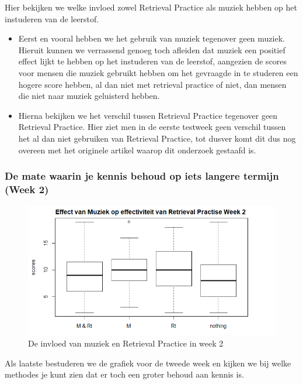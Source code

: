 \documentclass{hogent-article}
\begin{document}
Hier bekijken we welke invloed zowel Retrieval Practice als muziek hebben op het instuderen van de leerstof.
\\
\begin{itemize}
    \item Eerst en vooral hebben we het gebruik van muziek tegenover geen muziek.
    Hieruit kunnen we verrassend genoeg toch afleiden dat muziek een positief effect lijkt te hebben op het instuderen van de leerstof, aangezien de scores voor mensen die muziek gebruikt hebben om het gevraagde in te studeren een hogere score hebben, al dan niet met retrieval practice of niet, dan mensen die niet naar muziek geluisterd hebben.
    \\
    \item Hierna bekijken we het verschil tussen Retrieval Practice tegenover geen Retrieval Practice.
    Hier ziet men in de eerste testweek geen verschil tussen het al dan niet gebruiken van Retrieval Practice, tot dusver komt dit dus nog overeen met het originele artikel \textcite{Roediger2006} waarop dit onderzoek gestaafd is.
    
\end{itemize}

\subsubsection{De mate waarin je kennis behoud op iets langere termijn (Week 2)}

\begin{figure}[H]
	\includegraphics[width=\linewidth]{muziekGraph2}
    \caption{De invloed van muziek en Retrieval Practice in week 2}
\end{figure}

Als laatste bestuderen we de grafiek voor de tweede week en kijken we bij welke methodes je kunt zien dat er toch een groter behoud aan kennis is.\\
\end{document}
